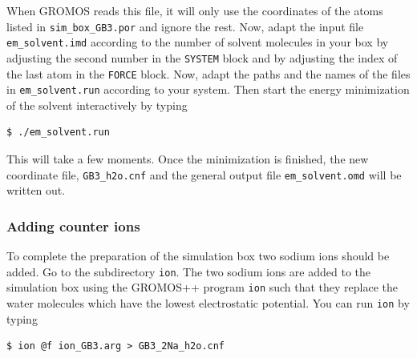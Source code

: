 When GROMOS reads this file, it will only use the coordinates of the atoms listed in \texttt{sim\_box\_GB3.por} and ignore the rest. 
Now, adapt the input file \texttt{em\_solvent.imd} according to the number of solvent molecules in your box by adjusting the second number in the \texttt{SYSTEM} block and by adjusting the index of the last atom in the \texttt{FORCE} block.
Now, adapt the paths and the names of the files in \texttt{em\_solvent.run} according to your system. 
Then start the energy minimization of the solvent interactively by typing 
\begin{lstlisting}
$ ./em_solvent.run
\end{lstlisting}
This will take a few moments. Once the minimization is finished, the new coordinate file, \texttt{GB3\_h2o.cnf} and the general output file \texttt{em\_solvent.omd} will be written out. 

\subsubsection{Adding counter ions}

To complete the preparation of the simulation box two sodium ions should be added. Go to the subdirectory \texttt{ion}. The two sodium ions are added to the simulation box using the GROMOS++ program \texttt{ion} such that they replace the water molecules which have the lowest electrostatic potential. You can run \texttt{ion} by typing
\begin{lstlisting}
$ ion @f ion_GB3.arg > GB3_2Na_h2o.cnf
\end{lstlisting}

